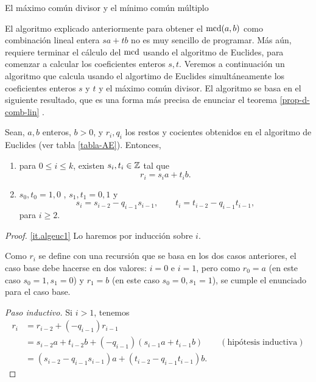 \begin{section}{El máximo común divisor y el mínimo común múltiplo}
\begin{observacion*}[*]
El  algoritmo explicado anteriormente para obtener el $\operatorname{mcd}(a,b)$ como combinación lineal entera $sa+tb$ no es muy sencillo de programar. Más aún, requiere terminar el cálculo del $\operatorname{mcd}$ usando el algoritmo de Euclides, para comenzar a calcular los coeficientes enteros $s,t$. Veremos a continuación un algoritmo que calcula usando el algortimo de Euclides simultáneamente los coeficientes enteros $s$ y $t$ y  el máximo común divisor.  El algoritmo se basa en el siguiente resultado,  que es una forma más precisa de enunciar el teorema \ref{prop-d-comb-lin} . 
\end{observacion*}

\begin{proposicion}\label{prop-alg-euclides-2} Sean, $a,b$ enteros, $b>0$, y $r_i, q_i$ los restos y cocientes obtenidos en el algoritmo de Euclides (ver tabla \ref{tabla-AE}). Entonces, 
\begin{enumerate}[label=\textit{\alph*)}]
    \item\label{it.algeuc1}     para $0 \le i \le k$,  existen $s_i, t_i \in \mathbb Z$ tal que
    \begin{equation*}
    r_i = s_ia + t_ib.
    \end{equation*}
    \item\label{it.algeuc2} $s_0, t_0 = 1, 0$ , $s_1, t_1 = 0, 1$ y 
    \begin{equation}
    s_{i} = s_{i-2} - q_{i-1}  s_{i-1}, \qquad t_{i} = t_{i-2} - q_{i-1}  t_{i-1},
    \end{equation}
    para $i \ge 2$.
\end{enumerate}
\end{proposicion}
\begin{proof}
    \ref{it.algeuc1} Lo haremos por inducción sobre $i$.
    
    Como $r_i$ se define con una recursión que se basa en los dos casos anteriores, el caso base debe hacerse en dos valores: $i=0$ e $i=1$, pero como  $r_0 = a$ (en este caso $s_0=1, s_1 =0$) y $r_1 =b$ (en este caso $s_0=0, s_1 =1$), se cumple el enunciado para el caso base. 
    
    \textit{Paso inductivo. } Si $i>1$, tenemos
    \begin{align*}
        r_i &= r_{i-2} + (-q_{i-1})r_{i-1}   \\
             &= s_{i-2}a + t_{i-2}b +(-q_{i-1})(s_{i-1}a + t_{i-1}b)\qquad (\text{hipótesis inductiva}) \\
             &= (s_{i-2}-q_{i-1}s_{i-1})a + (t_{i-2}-q_{i-1}t_{i-1}) b.   
    \end{align*}
    

\end{proof}
\end{section}
